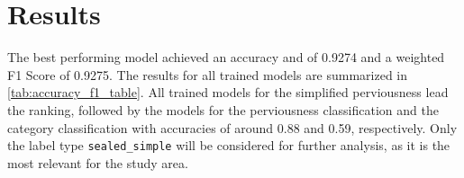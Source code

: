 


\section{Results}
\label{results}

The best performing model achieved an accuracy and of 0.9274 and a weighted F1 Score of 0.9275.
The results for all trained models are summarized in \autoref{tab:accuracy_f1_table}.
All trained models for the simplified perviousness lead the ranking, followed by the
models for the perviousness classification and the category classification
with accuracies of around 0.88 and 0.59, respectively. Only the label type \texttt{sealed\_simple}
will be considered for further analysis, as it is the most relevant for the study area.

